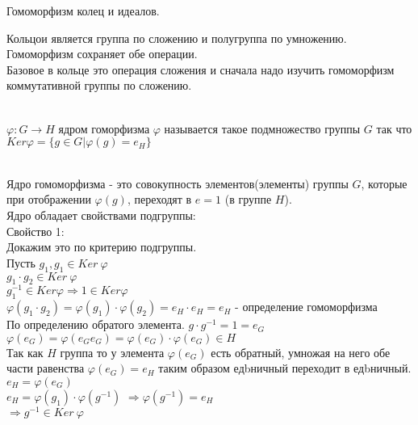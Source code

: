\begin{title}
	Гомоморфизм колец и идеалов.
\end{title}

Кольцои является группа по сложению и полугруппа по умножению.\\
Гомоморфизм сохраняет обе операции.\\
Базовое в кольце это операция сложения и сначала надо изучить гомоморфизм
коммутативной группы по сложению.\\


\\

\begin{defin}
$\varphi : G \to H$ ядром гоморфизма $\varphi$ называется такое подмножество
группы $G$ так что $Ker \varphi = \{g \in G| \varphi (g) = e_H\}$\\
\end{defin}
\\
Ядро гомоморфизма - это совокупность элементов(элементы) группы $G$, которые 
при отображении $\varphi(g)$, переходят в $e = 1$ (в группе $H$).\\
Ядро обладает свойствами подгруппы:\\
Свойство 1:\\
Докажим это по критерию подгруппы.\\
Пусть $g_1,g_1 \in Ker~\varphi$\\
$g_1 \cdot g_2 \in Ker~\varphi$\\
$g_1^{-1} \in Ker \varphi \Rightarrow 1 \in Ker \varphi$\\
$\varphi(g_1 \cdot g_2) = \varphi (g_1) \cdot \varphi (g_2) = e_H \cdot e_H = e_H$ - определение гомоморфизма\\
По определению обратого элемента. $g\cdot g^{-1} = 1 = e_G$\\
$\varphi(e_G) = \varphi(e_G e_G) = \varphi(e_G) \cdot \varphi(e_G) \in H$\\
Так как $H$ группа то у элемента $\varphi(e_G)$ есть обратный, умножая на него
обе части равенства $\varphi(e_G) = e_H$ таким образом едbничный переходит в
едbничный.\\
$e_H = \varphi(e_G)$\\
$e_H = \varphi(g_1)\cdot \varphi(g^{-1})$
$\Rightarrow \varphi(g^{-1}) = e_H$\\
$\Rightarrow g^{-1} \in Ker~\varphi$\\

